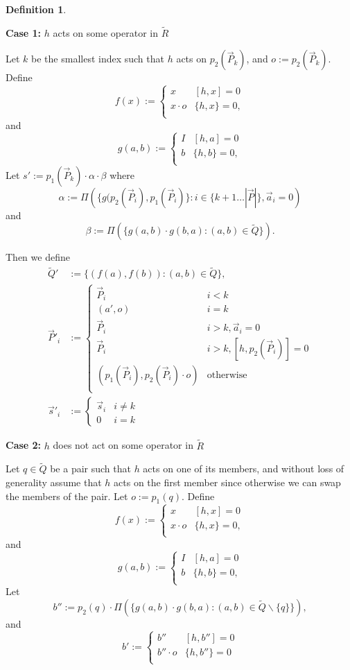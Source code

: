 \documentclass{amsbook}
\theoremstyle{plain}
\theoremstyle{definition}
\newtheorem{definition}{Definition}
\theoremstyle{remark}
\newcommand{\lst}{\vec}
\newcommand{\set}{\tilde}
\newcommand{\paren}[1]{\left(#1\right)}
\begin{document}
\begin{definition}
\begin{center}
\textbf{Case 1:} $h$ acts on some operator in $\set R$
\end{center}

Let $k$ be the smallest index such that $h$ acts on $p_2(\lst P_k)$, and $o:=p_2(\lst P_k)$.  Define
$$
f(x) :=
\begin{cases}
x & [h,x] = 0 \\
x\cdot o & \{h,x\} = 0, \\
\end{cases}
$$
and
$$
g(a,b) :=
\begin{cases}
I & [h,a] = 0 \\
b & \{h,b\} = 0, \\
\end{cases}
$$
Let $s':=p_1(\lst P_k)\cdot \alpha \cdot \beta$ where
$$\alpha := \Pi\paren{\{g(p_2(\lst P_i),p_1(\lst P_i)\}:i\in\{k+1\dots |\lst P|\},\lst a_i=0}$$
and
$$\beta := \Pi\paren{\{g(a,b)\cdot g(b,a):(a,b)\in\set Q\}}.$$

Then we define
$$
\begin{aligned}
\set Q'&:= \{(f(a),f(b)):(a,b)\in\set Q\},\\
\lst P'_i&:=
\begin{cases}
\lst P_i & i < k \\
(a',o) & i = k \\
\lst P_i & i > k, \lst a_i=0 \\
\lst P_i & i > k, [h,p_2(\lst P_i)]=0 \\
(p_1(\lst P_i),p_2(\lst P_i)\cdot o) & \text{otherwise} \\
\end{cases}\\
\lst s'_i&:=
\begin{cases}
\lst s_i & i\ne k\\
0 & i =k
\end{cases}
\end{aligned}
$$

\begin{center}
\textbf{Case 2:} $h$ does not act on some operator in $\set R$
\end{center}

Let $q\in\set Q$ be a pair such that $h$ acts on one of its members, and without loss of generality assume that $h$ acts on the first member since otherwise we can swap the members of the pair.  Let $o:=p_1(q)$.
Define
$$
f(x) :=
\begin{cases}
x & [h,x] = 0 \\
x\cdot o & \{h,x\} = 0, \\
\end{cases}
$$
and
$$
g(a,b) :=
\begin{cases}
I & [h,a] = 0 \\
b & \{h,b\} = 0, \\
\end{cases}
$$
Let $$b'':=p_2(q)\cdot\Pi\paren{\{g(a,b)\cdot g(b,a):(a,b)\in\set Q\backslash\{q\}\}},$$ and
$$b':=
\begin{cases}
b'' & [h,b'']=0 \\
b''\cdot o & \{h,b''\}=0 \\
\end{cases}
$$


\end{definition}
\end{document}
